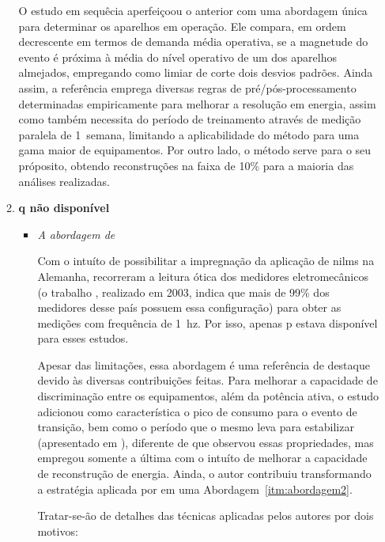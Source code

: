 \begin{enumerate}[label=\textbf{1.\arabic*},wide=\parindent]
\begin{enumerate}[label*=.\textbf{\arabic*},wide=\parindent]
O estudo em sequêcia aperfeiçoou o anterior com uma abordagem única
para determinar os aparelhos em operação. Ele compara, em ordem
decrescente em termos de demanda média operativa, se a magnetude
do evento é próxima à média do nível operativo de um dos aparelhos
almejados, empregando como limiar de corte dois desvios padrões. Ainda
assim, a referência emprega diversas regras de pré/pós-processamento
determinadas empiricamente para melhorar a resolução em energia, assim
como também necessita do período de treinamento através de medição
paralela de 1~semana, limitando a aplicabilidade do método para uma
gama maior de equipamentos. Por outro lado, o método serve para o seu
próposito, obtendo reconstruções na faixa de 10\% para a maioria das
análises realizadas.

\item \textbf{\Acrlong{q} não disponível}

\begin{itemize}[wide=\parindent]
\item \emph{A abordagem de 
\citeauthor*{nilm_baranski_genetic_base_2003_19}}

Com o intuíto de possibilitar a impregnação da aplicação de \glspl{nilm}
na Alemanha, \citet*{nilm_baranski_genetic_base_2003_19,
nilm_baranski_genetic_detalhado_2004_20,nilm_baranski_summary_2004_21}
recorreram a leitura ótica dos medidores eletromecânicos
(o trabalho \cite{nilm_baranski_genetic_base_2003_19}, realizado em
2003, indica que mais de 99\% dos medidores desse país possuem essa
configuração) para obter as medições com frequência de
1~\acs{hz}. Por isso, apenas \gls{p} estava disponível para esses
estudos. 

Apesar das limitações, essa abordagem é uma referência de destaque
devido às diversas contribuições feitas. Para melhorar a capacidade de
discriminação entre os equipamentos, além da potência ativa, o estudo
adicionou como característica o pico de consumo para o evento de
transição, bem como o período que o mesmo leva para estabilizar
(apresentado em \cite{nilm_baranski_genetic_detalhado_2004_20}),
diferente de \cite{nilm_cole_data_extraction_1998_14,
nilm_cole_extra_info_surge_1998_15} que observou essas propriedades,
mas empregou somente a última com o intuíto de melhorar a
capacidade de reconstrução de energia. Ainda, o autor contribuiu
transformando a estratégia aplicada por
\citeauthor*{nilm_hart_1992_8} em uma Abordagem~\ref{itm:abordagem2}.

Tratar-se-ão de detalhes das técnicas aplicadas pelos autores por dois
motivos:


\end{itemize}
\end{enumerate}
\end{enumerate}
